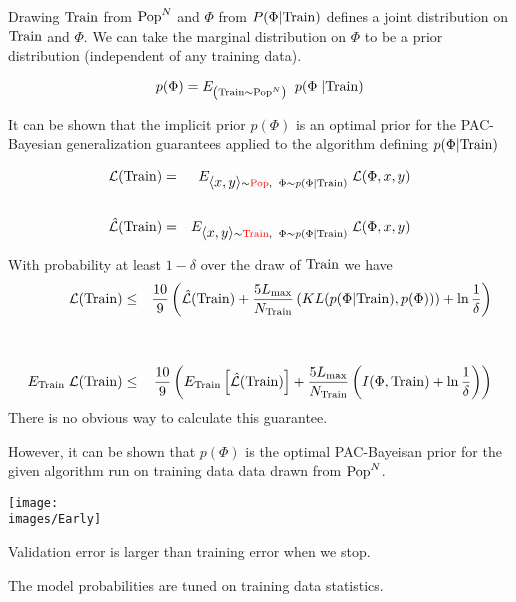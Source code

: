 {

Drawing $\mathrm{Train}$ from $\mathrm{Pop}^N$ and $\Phi$ from $P(\Phi|\mathrm{Train})$ defines a joint distribution on $\mathrm{Train}$ and $\Phi$.  We can take the marginal distribution on $\Phi$
to be a prior distribution (independent of any training data).

\vfill
$$p(\Phi) = E_{\left(\mathrm{Train} \sim \mathrm{Pop}^N\right)}\;\;p(\Phi\;|\mathrm{Train})$$

\vfill
It can be shown that the implicit prior $p(\Phi)$ is an optimal prior for the PAC-Bayesian generalization guarantees applied to the algorithm defining $p(\Phi|\mathrm{Train})$

\vfill
{}

\begin{eqnarray*}
{\cal L}(\mathrm{Train}) & = & E_{{\mbox{$\langle x,y\rangle$}} \sim {\color{red}  \mathrm{Pop}}, \;\;\Phi \sim p(\Phi|\mathrm{Train})}\;{\cal L}(\Phi,x,y) \\
\\
\hat{\cal L}(\mathrm{Train}) & = & E_{{\mbox{$\langle x,y\rangle$}} \sim {\color{red} \mathrm{Train}}, \;\;\Phi \sim p(\Phi|\mathrm{Train})}\;{\cal L}(\Phi,x,y)
\end{eqnarray*}


With probability at least $1-\delta$ over the draw of $\mathrm{Train}$ we have
\vfill
{\huge
\begin{eqnarray*}
{\cal L}(\mathrm{Train}) & \leq & \frac{10}{9}\left( \hat{\cal L}(\mathrm{Train}) + \frac{5L_{\max}}{N_\mathrm{Train}}\left(KL(p(\Phi|\mathrm{Train}),p(\Phi)\right))+ \ln\frac{1}{\delta}\right) \\
\\
\\
E_{\mathrm{Train}}\; {\cal L}(\mathrm{Train})& \leq & \frac{10}{9}\left( E_{\mathrm{Train}}\left[\hat{\cal L}(\mathrm{Train})\right] + \frac{5L_{\max}}{N_\mathrm{Train}}\left(I(\Phi,\mathrm{Train})+ \ln\frac{1}{\delta}\right)\right)
\end{eqnarray*}
}
\vfill
There is no obvious way to calculate this guarantee.

\vfill
However, it can be shown that $p(\Phi)$ is the optimal PAC-Bayeisan prior for the given algorithm run on training data data drawn from $\mathrm{Pop}^N$.


\centerline{\texttt{[image: \\images/Early]}}

\vfill
Validation error is larger than training error when we stop.

\vfill
The model probabilities are tuned on training data statistics.

}
